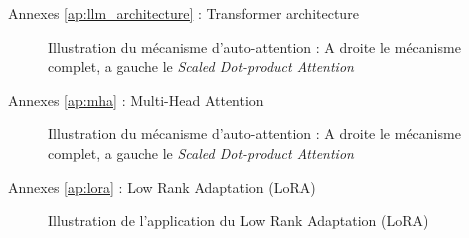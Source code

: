 \begin{frame}{Annexes \ref{ap:llm_architecture} : Transformer architecture}
    \label{ap:llm_architecture}
    \begin{figure}
        \centering
        
        \caption{Illustration du mécanisme d'auto-attention : A droite le mécanisme complet, a gauche le \textit{Scaled Dot-product Attention}}
    \end{figure}
    
\end{frame}

\begin{frame}{Annexes \ref{ap:mha} : Multi-Head Attention}
    \label{ap:mha}
    \begin{figure}
        \centering
        
        \caption{Illustration du mécanisme d'auto-attention : A droite le mécanisme complet, a gauche le \textit{Scaled Dot-product Attention}}
    \end{figure}
    
\end{frame}

\begin{frame}{Annexes \ref{ap:lora} : Low Rank Adaptation (LoRA)}
    \label{ap:lora}
    \begin{figure}
        \centering
        
        \caption{Illustration de l'application du Low Rank Adaptation (LoRA)}
    \end{figure}
    
\end{frame}